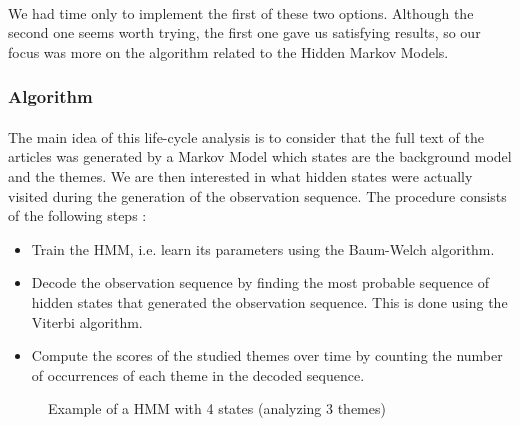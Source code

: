 \paragraph{}
We had time only to implement the first of these two options. Although the second one seems worth trying, the first one gave us satisfying results, so our focus was more on the algorithm related to the Hidden Markov Models.

\subsubsection*{Algorithm}
\paragraph{}
The main idea of this life-cycle analysis is to consider that the full text of the articles was generated by a Markov Model which states are the background model and the themes. We are then interested in what hidden states were actually visited during the generation of the observation sequence. The procedure consists of the following steps :
\begin{itemize}
\item Train the HMM, i.e. learn its parameters using the Baum-Welch algorithm.
\item Decode the observation sequence by finding the most probable sequence of hidden states that generated the observation sequence. This is done using the Viterbi algorithm.
\item Compute the scores of the studied themes over time by counting the number of occurrences of each theme in the decoded sequence.
\end{itemize}

\begin{figure}[H]
\begin{center}
\label{fig:hmm}
 \caption{Example of a HMM with 4 states (analyzing 3 themes)}
\end{center}
\end{figure}

